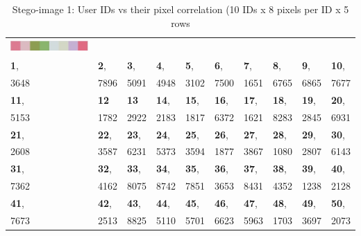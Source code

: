 

    \begin{table}[h!]
    \caption{Stego-image 1: User IDs vs their pixel correlation (10 IDs x 8 pixels per ID x 5 rows}
    \centering
     \begin{tabular}{|p{} | p{}| p{} | p{} | p{} | p{} | p{} | p{} | p{} | p{} |} 
     
     \hline
     \begin{minipage}{.075\textwidth}
      \includegraphics[width=\linewidth, height=5mm]{Chapter3/Figs/TablePixels.jpg}
    \end{minipage}& & & & & & & & & \\[1ex]
     \textbf{1}, & \textbf{2}, & \textbf{3}, & \textbf{4}, & \textbf{5}, & \textbf{6}, & \textbf{7}, & \textbf{8}, & \textbf{9}, & \textbf{10},  \\[1ex]
     3648 & 7896 & 5091 & 4948 & 3102 & 7500 & 1651 & 6765 & 6865 & 7677  \\[1ex]
     
     \hline 
     \textbf{11}, & \textbf{12} & \textbf{13} & \textbf{14}, & \textbf{15}, & \textbf{16}, & \textbf{17}, & \textbf{18}, & \textbf{19}, & \textbf{20},  \\[1ex]
    5153 & 1782 & 2922 & 2183 & 1817 & 6372 & 1621 & 8283 & 2845 & 6931  \\[1ex]
     
     \hline
     \textbf{21}, & \textbf{22}, & \textbf{23}, & \textbf{24}, & \textbf{25}, & \textbf{26}, & \textbf{27}, & \textbf{28}, & \textbf{29}, & \textbf{30},  \\[1ex]
    2608 & 3587 & 6231 & 5373 & 3594 & 1877 & 3867 & 1080 & 2807 & 6143  \\[1ex]
     
     \hline           
     \textbf{31}, & \textbf{32}, & \textbf{33}, & \textbf{34}, & \textbf{35}, & \textbf{36}, & \textbf{37}, & \textbf{38}, & \textbf{39}, & \textbf{40},  \\[1ex]
     7362 & 4162 & 8075 & 8742 & 7851 & 3653 & 8431 & 4352 & 1238 & 2128  \\[1ex]
     
     \hline
     \textbf{41}, & \textbf{42}, & \textbf{43}, & \textbf{44}, & \textbf{45}, & \textbf{46}, & \textbf{47}, & \textbf{48}, & \textbf{49}, & \textbf{50},  \\[1ex]
    7673 & 2513 & 8825 & 5110 & 5701 & 6623 & 5963 & 1703 & 3697 & 2073  \\[1ex]
     
     \hline
     
     \end{tabular}
    \end{table}
    


